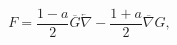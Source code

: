 \begin{equation}
F=\frac{1-a}{2}\overline{G}\overleftarrow{\nabla}-\frac{1+a}{2}\overline{\nabla
}G  , \label{66}
\end{equation}

